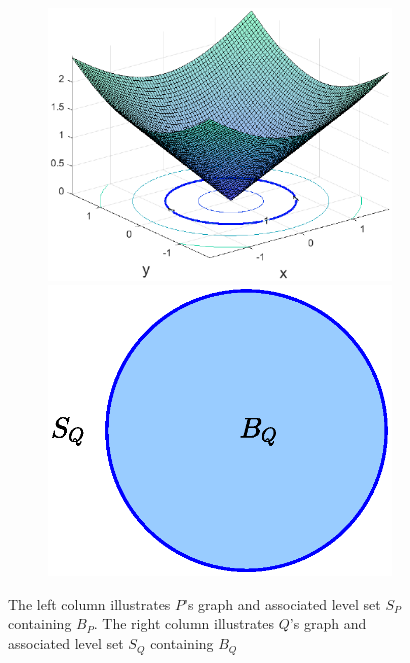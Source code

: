 \documentclass[smallextended]{svjour3}
\theoremstyle{remark}
\begin{document}
\begin{example}
\begin{figure}[!htb]
\begin{subfigure}{0.5\textwidth}
    \includegraphics[scale=0.4]{Fig2c.eps}
    \vspace{-10pt}
    \includegraphics[scale=0.4]{Fig2d.eps}
    \end{subfigure}
    \caption{The left column illustrates $P$'s graph and associated level set $S_P$ containing $B_P$. The right column illustrates $Q$'s graph and associated level set $S_Q$ containing $B_Q$}
    \label{fig:Weierstrass}
\end{figure}
\end{example}
\end{document}
